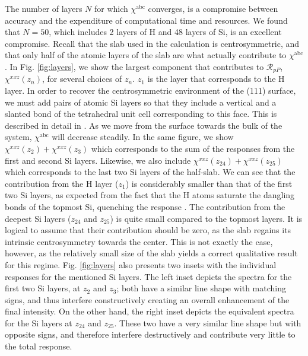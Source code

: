 \documentclass[utf8]{frontiersSCNS}
\begin{document}
The number of layers $N$ for which $\chi^{\mathrm{abc}}$ converges, is a
compromise between accuracy and the expenditure of computational time and
resources. We found that $N = 50$, which includes 2 layers of H and 48 layers of
Si, is an excellent compromise. Recall that the slab used in the calculation is
centrosymmetric, and that only half of the atomic layers of the slab are what
actually contribute to $\chi^{\mathrm{abc}}$. In Fig. \ref{fig:layers}, we show
the largest component that contributes to $\mathcal{R}_{pP}$,
$\chi^{xxz}(z_{n})$, for several choices of $z_{n}$. $z_{1}$ is the layer that
corresponds to the H layer. In order to recover the centrosymmetric environment
of the (111) surface, we must add pairs of atomic Si layers so that they include
a vertical and a slanted bond of the tetrahedral unit cell corresponding to this
face. This is described in detail in \cite{mejiaRMF04}.
{\color{red}
As we move from the surface towards the bulk of the system,
$\chi^{\mathrm{abc}}$ will decrease steadily. In the same figure, we show
$\chi^{xxz}(z_{2})+\chi^{xxz}(z_{3})$ which corresponds to the sum of the
responses from the first and second Si layers. Likewise, we also include
$\chi^{xxz}(z_{24})+\chi^{xxz}(z_{25})$ which corresponds to the last two Si
layers of the half-slab. We can see that the contribution from the H layer
($z_{1}$) is considerably smaller than that of the first two Si layers, as
expected from the fact that the H atoms saturate the dangling bonds of the
topmost Si, quenching the response \citep{mejiaPRB02}. The contribution from the
deepest Si layers ($z_{24}$ and $z_{25}$) is quite small compared to the topmost
layers. It is logical to assume that their contribution should be zero, as the
slab regains its intrinsic centrosymmetry towards the center. This is not
exactly the case, however, as the relatively small size of the slab yields a
correct qualitative result for this regime. Fig. \ref{fig:layers} also presents
two insets with the individual responses for the mentioned Si layers. The left
inset depicts the spectra for the first two Si layers, at $z_{2}$ and $z_{3}$;
both have a similar line shape with matching signs, and thus interfere
constructively creating an overall enhancement of the final intensity. On the
other hand, the right inset depicts the equivalent spectra for the Si layers at
$z_{24}$ and $z_{25}$. These two have a very similar line shape but with
opposite signs, and therefore interfere destructively and contribute very little
to the total response.
}
\end{document}
